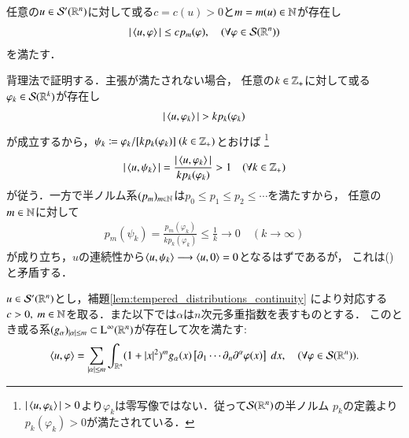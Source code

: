 	\begin{screen}
		\begin{lem}
			任意の$u \in \mathcal{S}'(\mathbb{R}^n)$に対して或る$c = c(u) > 0$と$m = m(u) \in \mathbb{N}$が存在し
			\begin{align}
				|\inprod<u,\varphi>| \leq c p_m(\varphi),
				\quad (\forall \varphi \in \rapid{\R^n})
			\end{align}
			を満たす．
			\label{lem:tempered_distributions_continuity}
		\end{lem}
	\end{screen}
	
	\begin{prf}
		背理法で証明する．主張が満たされない場合，
		任意の$k \in \mathbb{Z}_+$に対して或る$\varphi_k \in \mathcal{S}(\mathbb{R}^k)$が存在し
		\begin{align}
			|\inprod<u,\varphi_k>| > k p_k(\varphi_k)
		\end{align}
		が成立するから，$\psi_k \coloneqq \varphi_k / [k p_k(\varphi_k)]\ (k \in \mathbb{Z}_+)$とおけば
		\footnote{
			$|\inprod<u,\varphi_k>| > 0$より$\varphi_k$は零写像ではない．従って$\mathcal{S}(\mathbb{R}^n)$の半ノルム
			$p_k$の定義より$p_k(\varphi_k) > 0$が満たされている．
		}
		\begin{align}
			|\inprod<u,\psi_k>| = \frac{|\inprod<u,\varphi_k>|}{k p_k(\varphi_k)} > 1
			\quad (\forall k \in \Z_+)
			\label{eq:lem_tempered_distributions_continuity}
		\end{align}
		が従う．一方で半ノルム系$(p_m)_{m \in \mathbb{N}}$は$p_0 \leq p_1 \leq p_2 \leq \cdots$を満たすから，
		任意の$m \in \mathbb{N}$に対して
		\begin{align}
			p_m(\psi_k) = \frac{p_m(\varphi_k)}{k p_k(\varphi_k)} \leq \frac{1}{k}
			\longrightarrow 0 \quad (k \longrightarrow \infty)
		\end{align}
		が成り立ち，$u$の連続性から$\inprod<u,\psi_k> \longrightarrow \inprod<u,0> = 0$となるはずであるが，
		これは()と矛盾する．
		\QED
	\end{prf}
	
	\begin{screen}
		\begin{thm}[緩増加超関数の構造定理]
			$u \in \mathcal{S}'(\mathbb{R}^n)$とし，補題\ref{lem:tempered_distributions_continuity}
			により対応する$c > 0,\ m \in \mathbb{N}$を取る．また以下では$\alpha$は$n$次元多重指数を表すものとする．
			このとき或る系$(g_\alpha)_{|\alpha| \leq m} \subset \mathrm{L}^\infty(\mathbb{R}^n)$が存在して次を満たす:
			\begin{align}
				\inprod<u,\varphi> =
				\sum_{|\alpha| \leq m} \int_{\R^n} (1+|x|^2)^m g_\alpha(x) \left[ \partial_1 \cdots \partial_n \partial^\alpha \varphi(x) \right]\ dx,
				\quad (\forall \varphi \in \rapid{\R^n}).
			\end{align}
			\label{thm:structure_theorem_of_tempered_distributions}
		\end{thm}
	\end{screen}
	
